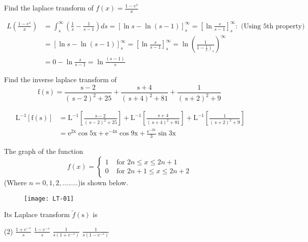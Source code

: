 \begin{exercise}
	Find the laplace transform of $f(x)=\frac{1-e^{x}}{x}$
\end{exercise}
\begin{answer}
	\begin{align*}
	L\left(\frac{1-e^{x}}{x}\right)&=\int_{s}^{\infty}\left(\frac{1}{s}-\frac{1}{s-1}\right) d s=[\ln s-\ln (s-1)]_{s}^{\infty}=\left[\ln \frac{s}{s-1}\right]_{s}^{\infty}:\text{ (Using 5th property)}\\
	&=[\ln s-\ln (s-1)]_{s}^{\infty}=\left[\ln \frac{s}{s-1}\right]_{s}^{\infty}=\ln \left(\frac{1}{\left.1-\frac{1}{s}\right)_{s}}\right)^{\infty} \\
	&=0-\ln \frac{s}{s-1}=\ln \frac{(s-1)}{s}
	\end{align*}
\end{answer}
\begin{exercise}
	Find the inverse laplace transform of
	$$\mathrm{f}(\mathrm{s}) =\frac{\mathrm{s}-2}{(\mathrm{~s}-2)^{2}+25}+\frac{\mathrm{s}+4}{(\mathrm{~s}+4)^{2}+81}+\frac{1}{(\mathrm{~s}+2)^{2}+9} $$
\end{exercise}
\begin{answer}
	\begin{align*}
	\mathrm{~L}^{-1}[\mathrm{f}(\mathrm{s})] &=\mathrm{L}^{-1}\left[\frac{\mathrm{s}-2}{(\mathrm{~s}-2)^{2}+25}\right]+\mathrm{L}^{-1}\left[\frac{\mathrm{s}+4}{(\mathrm{~s}+4)^{2}+81}\right]+\mathrm{L}^{-1}\left[\frac{1}{(\mathrm{~s}+2)^{2}+9}\right] \\
	&=\mathrm{e}^{2 \mathrm{x}} \cos 5 \mathrm{x}+\mathrm{e}^{-4 \mathrm{x}} \cos 9 \mathrm{x}+\frac{\mathrm{e}^{-2 \mathrm{x}}}{3} \sin 3 \mathrm{x}
	\end{align*}
\end{answer}
\begin{exercise}
	The graph of the function
	$$f(x)= \begin{cases}1 & \text { for } 2 n \leq x \leq 2 n+1 \\ 0 & \text { for } 2 n+1 \leq x \leq 2 n+2\end{cases}$$
	(Where $n=0,1,2,........$)is shown below.
	\begin{figure}[H]
		\centering
		\texttt{[image: LT-01]}
	\end{figure}
	Its Laplace transform $\tilde{f}(\mathrm{s})$ is
	 \begin{tasks}(2)
		\task[\textbf{a.}]$\frac{1+e^{-s}}{s}$
		\task[\textbf{b.}]$\frac{1-e^{-s}}{s}$
		\task[\textbf{c.}]$\frac{1}{s\left(1+e^{-s}\right)}$
		\task[\textbf{d.}]  $\frac{1}{s\left(1-e^{-s}\right)}$
	\end{tasks}
\end{exercise}
